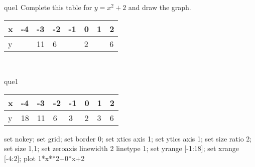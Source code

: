 \documentclass[13.5pt, varwidth=true]{beamer}
\begin{document}
\begin{frame}[shrink=19,fragile]
	\begin{beamercolorbox}[rounded=true, left, shadow=true,wd=14.8cm]{que1}
		 Complete this table for $y = x^{2} + 2$ and draw the graph. \\[0.3cm] \renewcommand{\arraystretch}{1.2}\begin{tabular}{|C|C|C|C|C|C|C|C|} \hline x & -4 & -3 & -2 & -1 & 0 & 1 & 2 \\ \hline y &  & 11 & 6 &  & 2 &  & 6\\ \hline \end{tabular}\\[0.3cm]
	\end{beamercolorbox}
\end{frame}
\begin{frame}[shrink=19,fragile]
	\begin{beamercolorbox}[rounded=true, left, shadow=true,wd=14.8cm]{que1}
		\renewcommand{\arraystretch}{1.2}\begin{tabular}{|C|C|C|C|C|C|C|C|} \hline x & -4 & -3 & -2 & -1 & 0 & 1 & 2 \\ \hline y & 18 & 11 & 6 & 3 & 2 & 3 & 6\\ \hline \end{tabular}\begin{gnuplot}[terminal=pdf] set nokey; set grid; set border 0; set xtics axis 1; set ytics axis 1; set size ratio 2; set size 1,1; set zeroaxis linewidth 2 linetype 1; set yrange [-1:18]; set xrange [-4:2]; plot 1*x**2+0*x+2 \end{gnuplot}
	\end{beamercolorbox}
\end{frame}
\end{document}
